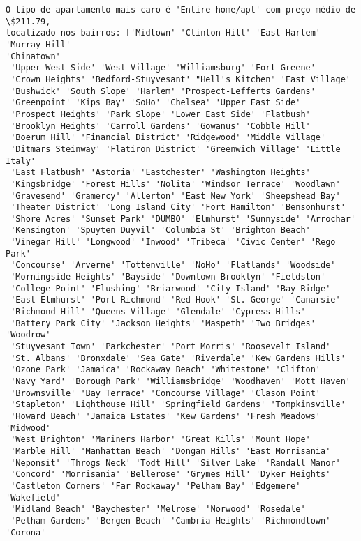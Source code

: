 \documentclass[11pt]{article}
\begin{document}
    \begin{Verbatim}[commandchars=\\\{\}]
O tipo de apartamento mais caro é 'Entire home/apt' com preço médio de \$211.79,
localizado nos bairros: ['Midtown' 'Clinton Hill' 'East Harlem' 'Murray Hill'
'Chinatown'
 'Upper West Side' 'West Village' 'Williamsburg' 'Fort Greene'
 'Crown Heights' 'Bedford-Stuyvesant' "Hell's Kitchen" 'East Village'
 'Bushwick' 'South Slope' 'Harlem' 'Prospect-Lefferts Gardens'
 'Greenpoint' 'Kips Bay' 'SoHo' 'Chelsea' 'Upper East Side'
 'Prospect Heights' 'Park Slope' 'Lower East Side' 'Flatbush'
 'Brooklyn Heights' 'Carroll Gardens' 'Gowanus' 'Cobble Hill'
 'Boerum Hill' 'Financial District' 'Ridgewood' 'Middle Village'
 'Ditmars Steinway' 'Flatiron District' 'Greenwich Village' 'Little Italy'
 'East Flatbush' 'Astoria' 'Eastchester' 'Washington Heights'
 'Kingsbridge' 'Forest Hills' 'Nolita' 'Windsor Terrace' 'Woodlawn'
 'Gravesend' 'Gramercy' 'Allerton' 'East New York' 'Sheepshead Bay'
 'Theater District' 'Long Island City' 'Fort Hamilton' 'Bensonhurst'
 'Shore Acres' 'Sunset Park' 'DUMBO' 'Elmhurst' 'Sunnyside' 'Arrochar'
 'Kensington' 'Spuyten Duyvil' 'Columbia St' 'Brighton Beach'
 'Vinegar Hill' 'Longwood' 'Inwood' 'Tribeca' 'Civic Center' 'Rego Park'
 'Concourse' 'Arverne' 'Tottenville' 'NoHo' 'Flatlands' 'Woodside'
 'Morningside Heights' 'Bayside' 'Downtown Brooklyn' 'Fieldston'
 'College Point' 'Flushing' 'Briarwood' 'City Island' 'Bay Ridge'
 'East Elmhurst' 'Port Richmond' 'Red Hook' 'St. George' 'Canarsie'
 'Richmond Hill' 'Queens Village' 'Glendale' 'Cypress Hills'
 'Battery Park City' 'Jackson Heights' 'Maspeth' 'Two Bridges' 'Woodrow'
 'Stuyvesant Town' 'Parkchester' 'Port Morris' 'Roosevelt Island'
 'St. Albans' 'Bronxdale' 'Sea Gate' 'Riverdale' 'Kew Gardens Hills'
 'Ozone Park' 'Jamaica' 'Rockaway Beach' 'Whitestone' 'Clifton'
 'Navy Yard' 'Borough Park' 'Williamsbridge' 'Woodhaven' 'Mott Haven'
 'Brownsville' 'Bay Terrace' 'Concourse Village' 'Clason Point'
 'Stapleton' 'Lighthouse Hill' 'Springfield Gardens' 'Tompkinsville'
 'Howard Beach' 'Jamaica Estates' 'Kew Gardens' 'Fresh Meadows' 'Midwood'
 'West Brighton' 'Mariners Harbor' 'Great Kills' 'Mount Hope'
 'Marble Hill' 'Manhattan Beach' 'Dongan Hills' 'East Morrisania'
 'Neponsit' 'Throgs Neck' 'Todt Hill' 'Silver Lake' 'Randall Manor'
 'Concord' 'Morrisania' 'Bellerose' 'Grymes Hill' 'Dyker Heights'
 'Castleton Corners' 'Far Rockaway' 'Pelham Bay' 'Edgemere' 'Wakefield'
 'Midland Beach' 'Baychester' 'Melrose' 'Norwood' 'Rosedale'
 'Pelham Gardens' 'Bergen Beach' 'Cambria Heights' 'Richmondtown' 'Corona'

\end{Verbatim}
\end{document}
